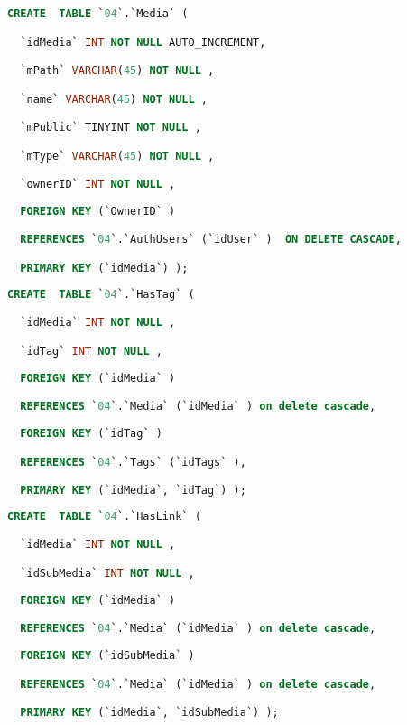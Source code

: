 \begin{Code}
\begin{lstlisting}[language=SQL,breaklines=true, label=createMedia, caption=Create Media, ]
CREATE  TABLE `04`.`Media` (

  `idMedia` INT NOT NULL AUTO_INCREMENT,

  `mPath` VARCHAR(45) NOT NULL ,

  `name` VARCHAR(45) NOT NULL ,

  `mPublic` TINYINT NOT NULL ,

  `mType` VARCHAR(45) NOT NULL ,

  `ownerID` INT NOT NULL ,
  
  FOREIGN KEY (`OwnerID` )

  REFERENCES `04`.`AuthUsers` (`idUser` )  ON DELETE CASCADE,

  PRIMARY KEY (`idMedia`) );

\end{lstlisting}
\end{Code}

\begin{Code}
\begin{lstlisting}[language=SQL,breaklines=true, label=createHasTag, caption=Create HasTag, ]
CREATE  TABLE `04`.`HasTag` (

  `idMedia` INT NOT NULL ,

  `idTag` INT NOT NULL ,
  
  FOREIGN KEY (`idMedia` )

  REFERENCES `04`.`Media` (`idMedia` ) on delete cascade,
  
  FOREIGN KEY (`idTag` )

  REFERENCES `04`.`Tags` (`idTags` ),

  PRIMARY KEY (`idMedia`, `idTag`) );

\end{lstlisting}
\end{Code}

\begin{Code}
\begin{lstlisting}[language=SQL,breaklines=true, label=createHasLink, caption=Create HasLink, ]
CREATE  TABLE `04`.`HasLink` (

  `idMedia` INT NOT NULL ,

  `idSubMedia` INT NOT NULL ,
  
  FOREIGN KEY (`idMedia` )

  REFERENCES `04`.`Media` (`idMedia` ) on delete cascade,
  
  FOREIGN KEY (`idSubMedia` )

  REFERENCES `04`.`Media` (`idMedia` ) on delete cascade,

  PRIMARY KEY (`idMedia`, `idSubMedia`) );

\end{lstlisting}
\end{Code}

